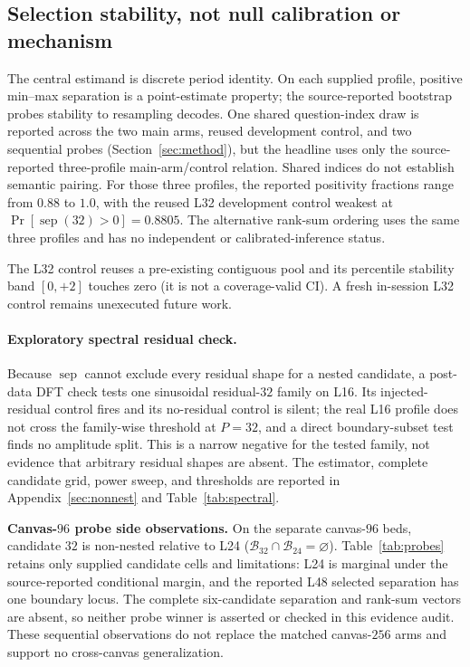 \documentclass{article}
\begin{document}
\subsection{Selection stability, not null calibration or mechanism}

The central estimand is discrete period identity. On each supplied profile,
positive min--max separation is a point-estimate property; the source-reported
bootstrap probes stability to resampling decodes. One shared question-index draw
is reported across the two main arms, reused development control, and two
sequential probes (Section~\ref{sec:method}), but the headline uses only the
source-reported three-profile main-arm/control relation. Shared indices do not
establish semantic pairing. For those three profiles, the reported positivity
fractions range from $0.88$ to $1.0$, with the reused L32 development control weakest at
$\Pr[\operatorname{sep}(32){>}0]{=}0.8805$.  The alternative rank-sum ordering
uses the same three profiles and has no independent or calibrated-inference
status.

The L32 control reuses a pre-existing
contiguous pool and its percentile stability band $[0,+2]$ touches zero (it is
not a coverage-valid CI). A fresh in-session L32 control remains unexecuted
future work.

\FloatBarrier
\paragraph{Exploratory spectral residual check.}
Because $\operatorname{sep}$ cannot exclude every residual shape for a nested
candidate, a post-data DFT check tests one sinusoidal residual-$32$ family on L16.
Its injected-residual control fires and its no-residual control is silent; the
real L16 profile does not cross the family-wise threshold at $P=32$, and a direct
boundary-subset test finds no amplitude split. This is a narrow negative for the
tested family, not evidence that arbitrary residual shapes are absent. The
estimator, complete candidate grid, power sweep, and thresholds are reported in
Appendix~\ref{sec:nonnest} and Table~\ref{tab:spectral}.

\textbf{Canvas-$96$ probe side observations.} On the separate canvas-$96$ beds,
candidate $32$ is non-nested relative to L24
($\mathcal B_{32}\cap\mathcal B_{24}=\varnothing$).  Table~\ref{tab:probes}
retains only supplied candidate cells and limitations: L24 is marginal under the
source-reported conditional margin, and the reported L48 selected separation has
one boundary locus.  The complete six-candidate separation and rank-sum vectors
are absent, so neither probe winner is asserted or checked in this evidence
audit.  These sequential observations do not replace the matched canvas-$256$
arms and support no cross-canvas generalization.
\end{document}
